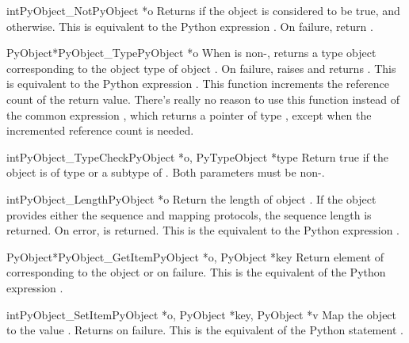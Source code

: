 \begin{cfuncdesc}{int}{PyObject_Not}{PyObject *o}
  Returns  if the object  is considered to be true, and
   otherwise.  This is equivalent to the Python expression
  .  On failure, return . 
\end{cfuncdesc}


\begin{cfuncdesc}{PyObject*}{PyObject_Type}{PyObject *o}
  When  is non-\NULL, returns a type object corresponding to
  the object type of object . On failure, raises
   and returns \NULL.  This is equivalent to
  the Python expression .
  This function increments the reference count of the return value.
  There's really no reason to use this function instead of the
  common expression , which returns a pointer
  of type , except when the incremented reference
  count is needed.
\end{cfuncdesc}

\begin{cfuncdesc}{int}{PyObject_TypeCheck}{PyObject *o, PyTypeObject *type}
  Return true if the object  is of type  or a subtype
  of .  Both parameters must be non-\NULL.
\end{cfuncdesc}

\begin{cfuncdesc}{int}{PyObject_Length}{PyObject *o}
  Return the length of object .  If the object  provides
  either the sequence and mapping protocols, the sequence length is
  returned.  On error,  is returned.  This is the equivalent
  to the Python expression .
\end{cfuncdesc}


\begin{cfuncdesc}{PyObject*}{PyObject_GetItem}{PyObject *o, PyObject *key}
  Return element of  corresponding to the object  or
  \NULL{} on failure.  This is the equivalent of the Python expression
  .
\end{cfuncdesc}


\begin{cfuncdesc}{int}{PyObject_SetItem}{PyObject *o,
                                         PyObject *key, PyObject *v}
  Map the object  to the value .  Returns  on
  failure.  This is the equivalent of the Python statement
  .
\end{cfuncdesc}


